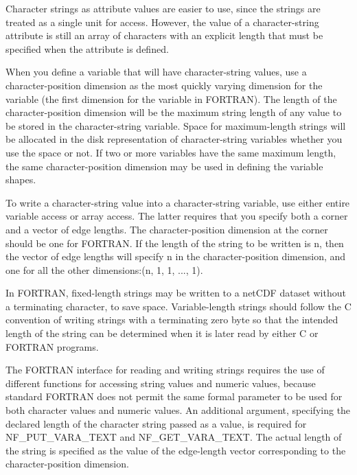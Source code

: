 Character strings as attribute values are easier to use, since the strings are treated as a single unit for access. However, the value of a character-\/string attribute is still an array of characters with an explicit length that must be specified when the attribute is defined.

When you define a variable that will have character-\/string values, use a character-\/position dimension as the most quickly varying dimension for the variable (the first dimension for the variable in F\+O\+R\+T\+R\+AN). The length of the character-\/position dimension will be the maximum string length of any value to be stored in the character-\/string variable. Space for maximum-\/length strings will be allocated in the disk representation of character-\/string variables whether you use the space or not. If two or more variables have the same maximum length, the same character-\/position dimension may be used in defining the variable shapes.

To write a character-\/string value into a character-\/string variable, use either entire variable access or array access. The latter requires that you specify both a corner and a vector of edge lengths. The character-\/position dimension at the corner should be one for F\+O\+R\+T\+R\+AN. If the length of the string to be written is n, then the vector of edge lengths will specify n in the character-\/position dimension, and one for all the other dimensions\+:(n, 1, 1, ..., 1).

In F\+O\+R\+T\+R\+AN, fixed-\/length strings may be written to a net\+C\+DF dataset without a terminating character, to save space. Variable-\/length strings should follow the C convention of writing strings with a terminating zero byte so that the intended length of the string can be determined when it is later read by either C or F\+O\+R\+T\+R\+AN programs.

The F\+O\+R\+T\+R\+AN interface for reading and writing strings requires the use of different functions for accessing string values and numeric values, because standard F\+O\+R\+T\+R\+AN does not permit the same formal parameter to be used for both character values and numeric values. An additional argument, specifying the declared length of the character string passed as a value, is required for N\+F\+\_\+\+P\+U\+T\+\_\+\+V\+A\+R\+A\+\_\+\+T\+E\+XT and N\+F\+\_\+\+G\+E\+T\+\_\+\+V\+A\+R\+A\+\_\+\+T\+E\+XT. The actual length of the string is specified as the value of the edge-\/length vector corresponding to the character-\/position dimension.

